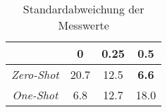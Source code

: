 \bgroup
\def\arraystretch{2}
\begin{table}[H]
	\vspace{.5cm}
	\centering		
	\begin{center}
		\begin{tabular}{|c||c|c|c|}
			\hline 
			& 0 & 0.25 & 0.5 \\
			\hline 
			\hline
			\textit{Zero-Shot} & 20.7 & 12.5 & \textbf{6.6} \\
			\hline
			\textit{One-Shot} & 6.8 & 12.7 & 18.0 \\
			\hline
		\end{tabular} 
	\end{center}
	\caption{Standardabweichung der Messwerte}
	\label{fig:line-var}
	\vspace{-.8cm}
\end{table}
\egroup